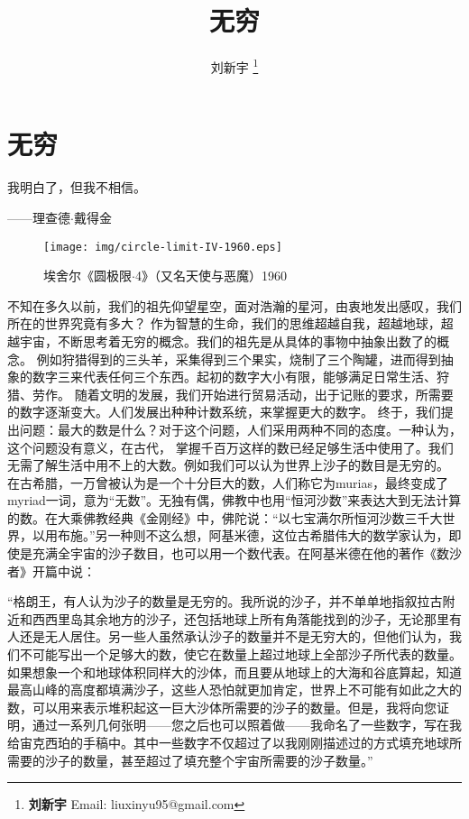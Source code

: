 \documentclass{article}
\begin{document}
\title{无穷}

\author{刘新宇
\thanks{{\bfseries 刘新宇} \newline
  Email: liuxinyu95@gmail.com \newline}
  }

\maketitle
\fi


\ifx\wholebook\relax
\chapter{无穷}
\fi

\epigraph{我明白了，但我不相信。}{——理查德$\cdot$戴得金}


\begin{wrapfigure}{R}{0.5\textwidth}
 \centering
 \texttt{[image: img/circle-limit-IV-1960.eps]}
 \captionsetup{labelformat=empty}
 \caption{埃舍尔《圆极限$\cdot$4》（又名天使与恶魔）1960}
 \label{fig:Penrose-triangle}
\end{wrapfigure}

不知在多久以前，我们的祖先仰望星空，面对浩瀚的星河，由衷地发出感叹，我们所在的世界究竟有多大？
作为智慧的生命，我们的思维超越自我，超越地球，超越宇宙，不断思考着无穷的概念。我们的祖先是从具体的事物中抽象出数了的概念。
例如狩猎得到的三头羊，采集得到三个果实，烧制了三个陶罐，进而得到抽象的数字三来代表任何三个东西。起初的数字大小有限，能够满足日常生活、狩猎、劳作。
随着文明的发展，我们开始进行贸易活动，出于记账的要求，所需要的数字逐渐变大。人们发展出种种计数系统，来掌握更大的数字。
终于，我们提出问题：最大的数是什么？对于这个问题，人们采用两种不同的态度。一种认为，这个问题没有意义，在古代，
掌握千百万这样的数已经足够生活中使用了。我们无需了解生活中用不上的大数。例如我们可以认为世界上沙子的数目是无穷的。
在古希腊，一万曾被认为是一个十分巨大的数，人们称它为murias，最终变成了myriad一词，意为“无数”\cite{De-linfini-2018}。无独有偶，佛教中也用“恒河沙数”来表达大到无法计算的数。在大乘佛教经典《金刚经》中，佛陀说：“以七宝满尔所恒河沙数三千大世界，以用布施。”另一种则不这么想，阿基米德，这位古希腊伟大的数学家认为，即使是充满全宇宙的沙子数目，也可以用一个数代表。在阿基米德在他的著作《数沙者》开篇中说：

“格朗王，有人认为沙子的数量是无穷的。我所说的沙子，并不单单地指叙拉古附近和西西里岛其余地方的沙子，还包括地球上所有角落能找到的沙子，无论那里有人还是无人居住。另一些人虽然承认沙子的数量并不是无穷大的，但他们认为，我们不可能写出一个足够大的数，使它在数量上超过地球上全部沙子所代表的数量。如果想象一个和地球体积同样大的沙体，而且要从地球上的大海和谷底算起，知道最高山峰的高度都填满沙子，这些人恐怕就更加肯定，世界上不可能有如此之大的数，可以用来表示堆积起这一巨大沙体所需要的沙子的数量。但是，我将向您证明，通过一系列几何张明——您之后也可以照着做——我命名了一些数字，写在我给宙克西珀的手稿中。其中一些数字不仅超过了以我刚刚描述过的方式填充地球所需要的沙子的数量，甚至超过了填充整个宇宙所需要的沙子数量。”
\end{document}
